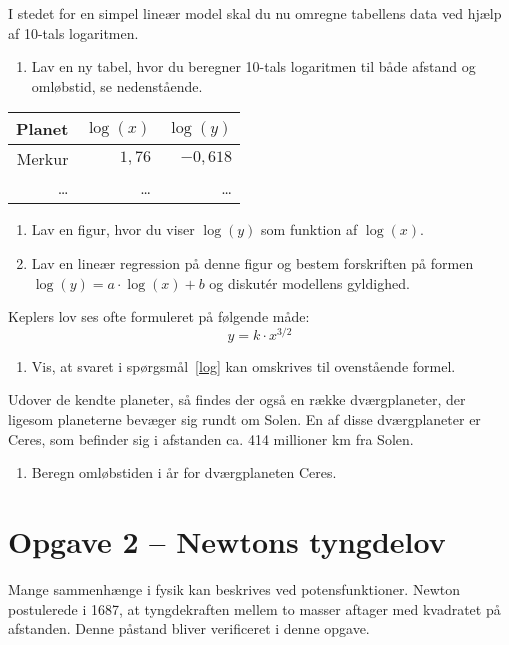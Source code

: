 \documentclass[12pt,oneside,a4paper]{article}
\theoremstyle{plain}
\begin{document}
I stedet for en simpel lineær model skal du nu omregne tabellens data ved hjælp af 
10-tals logaritmen.
\begin{enumerate}[label=(\alph*) ,resume]
    \item Lav en ny tabel, hvor du beregner 10-tals logaritmen til både afstand
        og omløbstid, se nedenstående.
\end{enumerate}

\begin{center}
\begin{tabular}{r|r|r}
    \hline
    Planet  & $\log(x)$   & $\log(y)$ \\
    \hline 
    Merkur  &  $1,76$ &   $-0,618$ \\
    \ldots  & \ldots    & \ldots  \\
    \hline 
\end{tabular}
\end{center}

\begin{enumerate}[label=(\alph*) ,resume]
    \item Lav en figur, hvor du viser $\log(y)$ som funktion af $\log(x)$.
    \item Lav en lineær regression på denne figur og bestem forskriften på formen
        $\log(y) = a\cdot\log(x)+b$ og diskutér modellens gyldighed. \label{log}
\end{enumerate}

Keplers lov ses ofte formuleret på følgende måde:
$$
y = k \cdot x^{3/2}
$$
\begin{enumerate}[label=(\alph*) ,resume]
    \item Vis, at svaret i spørgsmål~\ref{log} kan omskrives til ovenstående formel.
\end{enumerate}


Udover de kendte planeter, så findes der også en række dværgplaneter, der
ligesom planeterne bevæger sig rundt om Solen. En af disse dværgplaneter er
Ceres, som befinder sig i afstanden ca. 414 millioner km fra Solen.

\begin{enumerate}[label=(\alph*) ,resume]
    \item Beregn omløbstiden i år for dværgplaneten Ceres.
\end{enumerate}

\section*{Opgave 2 -- Newtons tyngdelov}
Mange sammenhænge i fysik kan beskrives ved potensfunktioner. Newton
postulerede i 1687, at tyngdekraften mellem to masser aftager med kvadratet på
afstanden.  Denne påstand bliver verificeret i denne opgave.
\end{document}
